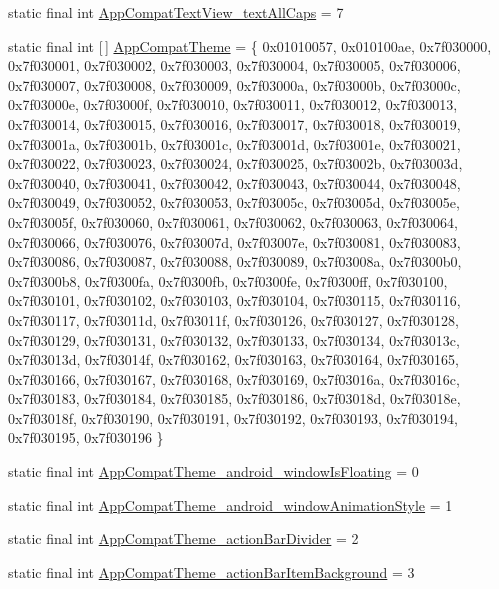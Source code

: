 \begin{DoxyCompactItemize}
static final int \mbox{\hyperlink{classandroid_1_1support_1_1design_1_1R_1_1styleable_a0baa66e50309da6d36b351e27495ab50}{App\+Compat\+Text\+View\+\_\+text\+All\+Caps}} = 7
\item 
static final int \mbox{[}$\,$\mbox{]} \mbox{\hyperlink{classandroid_1_1support_1_1design_1_1R_1_1styleable_afb351dc8de20cbd4c89abe360373010c}{App\+Compat\+Theme}} = \{ 0x01010057, 0x010100ae, 0x7f030000, 0x7f030001, 0x7f030002, 0x7f030003, 0x7f030004, 0x7f030005, 0x7f030006, 0x7f030007, 0x7f030008, 0x7f030009, 0x7f03000a, 0x7f03000b, 0x7f03000c, 0x7f03000e, 0x7f03000f, 0x7f030010, 0x7f030011, 0x7f030012, 0x7f030013, 0x7f030014, 0x7f030015, 0x7f030016, 0x7f030017, 0x7f030018, 0x7f030019, 0x7f03001a, 0x7f03001b, 0x7f03001c, 0x7f03001d, 0x7f03001e, 0x7f030021, 0x7f030022, 0x7f030023, 0x7f030024, 0x7f030025, 0x7f03002b, 0x7f03003d, 0x7f030040, 0x7f030041, 0x7f030042, 0x7f030043, 0x7f030044, 0x7f030048, 0x7f030049, 0x7f030052, 0x7f030053, 0x7f03005c, 0x7f03005d, 0x7f03005e, 0x7f03005f, 0x7f030060, 0x7f030061, 0x7f030062, 0x7f030063, 0x7f030064, 0x7f030066, 0x7f030076, 0x7f03007d, 0x7f03007e, 0x7f030081, 0x7f030083, 0x7f030086, 0x7f030087, 0x7f030088, 0x7f030089, 0x7f03008a, 0x7f0300b0, 0x7f0300b8, 0x7f0300fa, 0x7f0300fb, 0x7f0300fe, 0x7f0300ff, 0x7f030100, 0x7f030101, 0x7f030102, 0x7f030103, 0x7f030104, 0x7f030115, 0x7f030116, 0x7f030117, 0x7f03011d, 0x7f03011f, 0x7f030126, 0x7f030127, 0x7f030128, 0x7f030129, 0x7f030131, 0x7f030132, 0x7f030133, 0x7f030134, 0x7f03013c, 0x7f03013d, 0x7f03014f, 0x7f030162, 0x7f030163, 0x7f030164, 0x7f030165, 0x7f030166, 0x7f030167, 0x7f030168, 0x7f030169, 0x7f03016a, 0x7f03016c, 0x7f030183, 0x7f030184, 0x7f030185, 0x7f030186, 0x7f03018d, 0x7f03018e, 0x7f03018f, 0x7f030190, 0x7f030191, 0x7f030192, 0x7f030193, 0x7f030194, 0x7f030195, 0x7f030196 \}
\item 
static final int \mbox{\hyperlink{classandroid_1_1support_1_1design_1_1R_1_1styleable_a46b267f5526986760e108340d38903c0}{App\+Compat\+Theme\+\_\+android\+\_\+window\+Is\+Floating}} = 0
\item 
static final int \mbox{\hyperlink{classandroid_1_1support_1_1design_1_1R_1_1styleable_a9dc98748c7a94ae12cefeab10283092e}{App\+Compat\+Theme\+\_\+android\+\_\+window\+Animation\+Style}} = 1
\item 
static final int \mbox{\hyperlink{classandroid_1_1support_1_1design_1_1R_1_1styleable_af6a9eaeff0ad44a2869e2b2e9b333e1e}{App\+Compat\+Theme\+\_\+action\+Bar\+Divider}} = 2
\item 
static final int \mbox{\hyperlink{classandroid_1_1support_1_1design_1_1R_1_1styleable_ab149188e28f3773ec75d040a249d5459}{App\+Compat\+Theme\+\_\+action\+Bar\+Item\+Background}} = 3

\end{DoxyCompactItemize}
